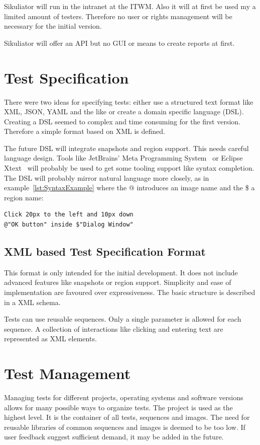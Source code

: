 \documentclass[a4paper,twocolumn]{article}
\newcommand{\Sik}[0]{Sikuliator}
\begin{document}
\Sik{} will run in the intranet at the ITWM.
Also it will at first be used my a limited amount of testers.
Therefore no user or rights management will be necessary for the initial version.

\Sik{} will offer an API but no GUI or means to create reports at first.



\section{Test Specification}
There were two ideas for specifying tests: either use a structured text format like XML, JSON, YAML and the like or create a domain specific language (DSL).
Creating a DSL seemed to complex and time consuming for the first version.
Therefore a simple format based on XML is defined.

The future DSL will integrate snapshots and region support.
This needs careful language design.
Tools like JetBrains' Meta Programming System~\cite{MPS}
or Eclipse Xtext~\cite{Xtext} will probably be used to get some tooling support like syntax completion.
The DSL will probably mirror natural language more closely, 
as in example~\ref{lst:SyntaxExample} where the @ introduces an image name and the \$ a region name:

\renewcommand{\lstlistingname}{Example}
\begin{lstlisting}[language=Pseudo,caption={Example for possible syntax},label={lst:SyntaxExample}]
Click 20px to the left and 10px down 
@"OK button" inside $"Dialog Window"
\end{lstlisting}

\subsection{XML based Test Specification Format}
This format is only intended for the initial development.
It does not include advanced features like snapshots or region support.
Simplicity and ease of implementation are favoured over expressiveness.
The basic structure is described in a XML schema.

Tests can use reusable sequences.
Only a single parameter is allowed for each sequence.
A collection of interactions like clicking and entering text are represented as XML elements.

\section{Test Management}
Managing tests for different projects, operating systems and software versions allows for many possible ways to organize tests.
The project is used as the highest level.
It is the container of all tests, sequences and images.
The need for reusable libraries of common sequences and images is deemed to be too low.
If user feedback suggest sufficient demand, it may be added in the future.
\end{document}

